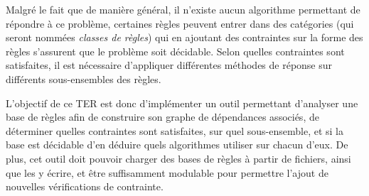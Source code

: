 
Malgré le fait que de manière général, il n'existe aucun algorithme permettant de
répondre à ce problème, certaines règles peuvent entrer dans des catégories (qui seront
nommées {\em classes de règles}) qui en ajoutant des contraintes sur la forme des règles
s'assurent que le problème soit décidable.
Selon quelles contraintes sont satisfaites, il est nécessaire d'appliquer différentes
méthodes de réponse sur différents sous-ensembles des règles.

L'objectif de ce TER est donc d'implémenter un outil permettant d'analyser une base de règles 
afin de construire son graphe
de dépendances associés, de déterminer quelles contraintes sont satisfaites, sur quel
sous-ensemble, et si la base est décidable d'en déduire quels algorithmes utiliser 
sur chacun d'eux. 
De plus, cet outil doit pouvoir charger des bases de règles à partir de fichiers, 
ainsi que les y écrire, 
et être suffisamment modulable pour permettre l'ajout de nouvelles vérifications
de contrainte.

